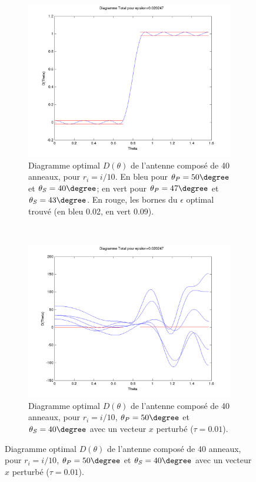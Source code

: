 \begin{figure}[h!]
  \centering
  \begin{subfigure}[b]{0.45\textwidth}
  \includegraphics[width=\textwidth]{D-ModLin.png}
  \caption{Diagramme optimal $D(\theta)$ de l'antenne composé de 40 anneaux, pour $r_i=i/10$. En bleu pour $\theta_P=50 \degree$ et $\theta_S=40 \degree$; en vert pour $\theta_P=47 \degree$ et $\theta_S=43 \degree$. En rouge, les bornes du $\epsilon$ optimal trouvé (en bleu 0.02, en vert 0.09).}
  \label{fig:D-ModLin}
  \end{subfigure}%
  ~ 
  \begin{subfigure}[b]{0.45\textwidth}
  \includegraphics[width=\textwidth]{D-ModLin-2RobustTau01.png}
  \caption{Diagramme optimal $D(\theta)$ de l'antenne composé de 40 anneaux, pour $r_i=i/10$, $\theta_P=50 \degree$ et $\theta_S=40 \degree$ avec un vecteur $x$ perturbé ($\tau = 0.01$).}

\end{subfigure}
\end{figure}
